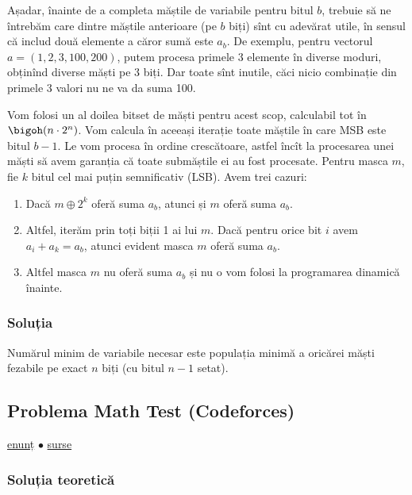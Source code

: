 Așadar, înainte de a completa măștile de variabile pentru bitul $b$, trebuie să ne întrebăm care dintre măștile anterioare (pe $b$ biți) sînt cu adevărat utile, în sensul că includ două elemente a căror sumă este $a_b$. De exemplu, pentru vectorul $a = (1, 2, 3, 100, 200)$, putem procesa primele 3 elemente în diverse moduri, obținînd diverse măști pe 3 biți. Dar toate sînt inutile, căci nicio combinație din primele 3 valori nu ne va da suma 100.

Vom folosi un al doilea bitset de măști pentru acest scop, calculabil tot în $\bigoh(n \cdot 2^n)$. Vom calcula în aceeași iterație toate măștile în care MSB este bitul $b-1$. Le vom procesa în ordine crescătoare, astfel încît la procesarea unei măști să avem garanția că toate submăștile ei au fost procesate. Pentru masca $m$, fie $k$ bitul cel mai puțin semnificativ (LSB). Avem trei cazuri:

\begin{enumerate}
  \item Dacă $m \oplus 2^k$ oferă suma $a_b$, atunci și $m$ oferă suma $a_b$.

  \item Altfel, iterăm prin toți biții 1 ai lui $m$. Dacă pentru orice bit $i$ avem $a_i + a_k = a_b$, atunci evident masca $m$ oferă suma $a_b$.

  \item Altfel masca $m$ nu oferă suma $a_b$ și nu o vom folosi la programarea dinamică înainte.
\end{enumerate}

\subsubsection*{Soluția}

Numărul minim de variabile necesar este populația minimă a oricărei măști fezabile pe exact $n$ biți (cu bitul $n-1$ setat).


\subsection{Problema Math Test (Codeforces)}
\label{problem:math-test}

\href{https://codeforces.com/contest/1622/problem/E}{enunț}
$\bullet$
\hyperref[code:math-test]{surse}

\subsubsection*{Soluția teoretică}


